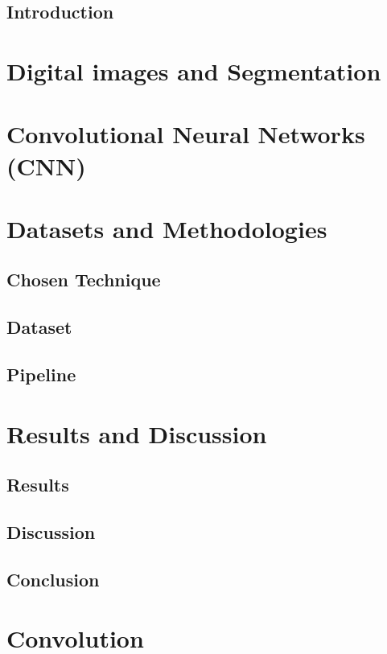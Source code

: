 \documentclass[12pt,a4paper]{report}
\begin{document}
\begin{titlepage}

\end{titlepage}


\clearpage{\pagestyle{empty}\cleardoublepage}
\tableofcontents               
{}


\clearpage{\pagestyle{empty}\cleardoublepage}
\section*{\LARGE{Introduction}}


\chapter{Digital images and Segmentation}



\newpage



\newpage

\chapter{Convolutional Neural Networks (CNN)}

\chapter{Datasets and Methodologies}

\section{Chosen Technique}
\section{Dataset}
\section{Pipeline}

\chapter{Results and Discussion}

\section{Results}
\section{Discussion}

\clearpage{\pagestyle{empty}\cleardoublepage}
\section*{\LARGE{Conclusion}}

\appendix
\chapter{Convolution}

\printbibliography[heading=bibintoc, title={Bibliography}]
\end{document}
